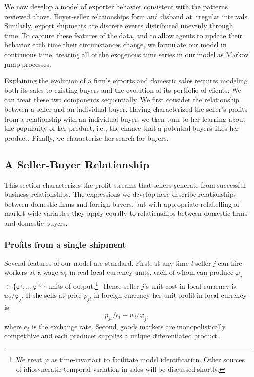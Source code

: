 \documentclass[12pt]{article}
\begin{document}
We now develop a model of exporter behavior consistent with the patterns
reviewed above. Buyer-seller relationships form and disband at irregular
intervals. Similarly, export shipments are discrete events distributed
unevenly through time. To capture these features of the data, and to allow
agents to update their behavior each time their circumstances change, we
formulate our model in continuous time, treating all of the exogenous
time series in our model as Markov jump processes.

Explaining the evolution of a firm's exports and domestic sales requires
modeling both its sales to existing buyers and the evolution of its
portfolio of clients. We can treat these two components sequentially. We
first consider the relationship between a seller and an individual buyer.
Having characterized the seller's profits from a relationship with an
individual buyer, we then turn to her learning about the popularity of her
product, i.e., the chance that a potential buyers likes her product.
Finally, we characterize her search for buyers.

\subsection{A Seller-Buyer Relationship}

This section characterizes the profit streams that sellers generate from
successful business relationships. The expressions we develop here describe
relationships between domestic firms and foreign buyers, but with
appropriate relabelling of market-wide variables they apply equally to
relationships between domestic firms and domestic buyers.

\subsubsection{Profits from a single shipment}

Several features of our model are standard. First, at any time $t$ seller $j$
can hire workers at a wage $w_{t}$ in real local currency units, each of
whom can produce $\varphi _{j}$ $\in \{\varphi ^{_{1}},..,\varphi
^{_{N_{\varphi }}}\}$ units of output.\footnote{%
We treat $\varphi $ as time-invariant to facilitate model identification.
Other sources of idiosyncratic temporal variation in sales will be discussed
shortly.\medskip} \ Hence seller $j$'s unit cost in local currency is $%
w_{t}/\varphi _{j}.$ If she sells at price $p_{jt}$ in foreign currency her
unit profit in local currency is%
\begin{equation}
p_{jt}/e_{t}-w_{t}/\varphi _{j},  \label{unit profit}
\end{equation}%
where $e_{t}$ is the exchange rate. Second, goods markets are
monopolistically competitive and each producer supplies a unique
differentiated product.
\end{document}
